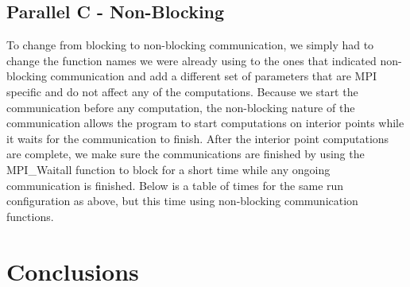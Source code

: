 \documentclass[11pt]{article}
\begin{document}
\subsection{Parallel C - Non-Blocking}
To change from blocking to non-blocking communication, we simply had to change the function names we were already using to the ones that indicated non-blocking communication and add a different set of parameters that are MPI specific and do not affect any of the computations. Because we start the communication before any computation, the non-blocking nature of the communication allows the program to start computations on interior points while it waits for the communication to finish. After the interior point computations are complete, we make sure the communications are finished by using the MPI\_Waitall function to block for a short time while any ongoing communication is finished. Below is a table of times for the same run configuration as above, but this time using non-blocking communication functions.

\section{Conclusions}
\end{document}
